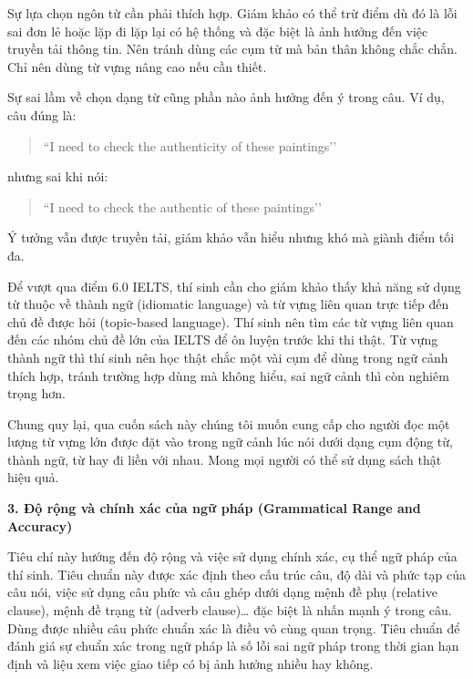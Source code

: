 \vspace{.25cm}
Sự lựa chọn ngôn từ cần phải thích hợp. Giám khảo có thể trừ điểm dù đó là lỗi sai đơn lẻ hoặc lặp đi lặp lại có hệ thống và đặc biệt là ảnh hưởng đến việc truyền tải thông tin. Nên tránh dùng các cụm từ mà bản thân không chắc chắn. Chỉ nên dùng từ vựng nâng cao nếu cần thiết.  

\vspace{.25cm}
Sự sai lầm về chọn dạng từ cũng phần nào ảnh hưởng đến ý trong câu. Ví dụ, câu đúng là:  
\begin{quote}
``I need to check the authenticity of these paintings’’  
\end{quote}  
nhưng sai khi nói:  
\begin{quote}
``I need to check the authentic of these paintings’’  
\end{quote}  

Ý tưởng vẫn được truyền tải, giám khảo vẫn hiểu nhưng khó mà giành điểm tối đa.  

\vspace{.25cm}
Để vượt qua điểm 6.0 IELTS, thí sinh cần cho giám khảo thấy khả năng sử dụng từ thuộc về thành ngữ (idiomatic language) và từ vựng liên quan trực tiếp đến chủ đề được hỏi (topic-based language). Thí sinh nên tìm các từ vựng liên quan đến các nhóm chủ đề lớn của IELTS để ôn luyện trước khi thi thật. Từ vựng thành ngữ thì thí sinh nên học thật chắc một vài cụm để dùng trong ngữ cảnh thích hợp, tránh trường hợp dùng mà không hiểu, sai ngữ cảnh thì còn nghiêm trọng hơn.  

\vspace{.25cm}
Chung quy lại, qua cuốn sách này chúng tôi muốn cung cấp cho người đọc một lượng từ vựng lớn được đặt vào trong ngữ cảnh lúc nói dưới dạng cụm động từ, thành ngữ, từ hay đi liền với nhau. Mong mọi người có thể sử dụng sách thật hiệu quả.  


\vspace{.25cm}
\textbf{3. Độ rộng và chính xác của ngữ pháp (Grammatical Range and Accuracy)}  

\vspace{.25cm}
Tiêu chí này hướng đến độ rộng và việc sử dụng chính xác, cụ thể ngữ pháp của thí sinh. Tiêu chuẩn này được xác định theo cấu trúc câu, độ dài và phức tạp của câu nói, việc sử dụng câu phức và câu ghép dưới dạng mệnh đề phụ (relative clause), mệnh đề trạng từ (adverb clause)… đặc biệt là nhấn mạnh ý trong câu. Dùng được nhiều câu phức chuẩn xác là điều vô cùng quan trọng. Tiêu chuẩn để đánh giá sự chuẩn xác trong ngữ pháp là số lỗi sai ngữ pháp trong thời gian hạn định và liệu xem việc giao tiếp có bị ảnh hưởng nhiều hay không.  

